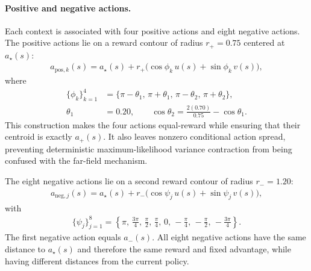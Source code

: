 \documentclass{article}
\theoremstyle{plain}
\theoremstyle{definition}
\theoremstyle{remark}
\begin{document}
\paragraph{Positive and negative actions.}
Each context is associated with four positive actions and eight negative
actions. The positive actions lie on a reward contour of radius
$r_+=0.75$
centered at $a_\star(s)$:
\begin{equation}
\begin{aligned}
    a_{\mathrm{pos},k}(s)
    =
    a_\star(s)
    +
    r_+
    \bigl(
        \cos\phi_k\,u(s)
        +
        \sin\phi_k\,v(s)
    \bigr),
\end{aligned}
\label{eq:cu1_positive_actions}
\end{equation}
where
\begin{equation}
\begin{aligned}
    \{\phi_k\}_{k=1}^{4}
    &=
    \{
        \pi-\theta_1,\,
        \pi+\theta_1,\,
        \pi-\theta_2,\,
        \pi+\theta_2
    \}, \\
    \theta_1
    &=
    0.20,
    \qquad
    \cos\theta_2
    =
    \frac{2(0.70)}{0.75}
    -
    \cos\theta_1.
\end{aligned}
\label{eq:cu1_positive_angles}
\end{equation}
This construction makes the four actions equal-reward while ensuring
that their centroid is exactly $a_+(s)$. It also leaves nonzero
conditional action spread, preventing deterministic maximum-likelihood
variance contraction from being confused with the far-field mechanism.

The eight negative actions lie on a second reward contour of radius
$r_-=1.20$:
\begin{equation}
\begin{aligned}
    a_{\mathrm{neg},j}(s)
    =
    a_\star(s)
    +
    r_-
    \bigl(
        \cos\psi_j\,u(s)
        +
        \sin\psi_j\,v(s)
    \bigr),
\end{aligned}
\label{eq:cu1_negative_actions}
\end{equation}
with
\begin{equation}
\begin{aligned}
    \{\psi_j\}_{j=1}^{8}
    =
    \left\{
        \pi,\,
        \frac{3\pi}{4},\,
        \frac{\pi}{2},\,
        \frac{\pi}{4},\,
        0,\,
        -\frac{\pi}{4},\,
        -\frac{\pi}{2},\,
        -\frac{3\pi}{4}
    \right\}.
\end{aligned}
\label{eq:cu1_negative_angles}
\end{equation}
The first negative action equals $a_-(s)$. All eight negative actions
have the same distance to $a_\star(s)$ and therefore the same reward and
fixed advantage, while having different distances from the current
policy.
\end{document}
